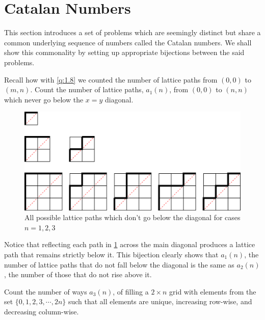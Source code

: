 \section{Catalan Numbers}
This section introduces a set of problems which are seemingly distinct but share a common underlying sequence of numbers called the Catalan numbers. We shall show this commonality by setting up appropriate bijections between the said problems. 
\begin{question}
Recall how with \cref{q:1.8} we counted the number of lattice paths from $(0,0)$ to $(m,n)$. Count the number of lattice paths, $a_1(n)$, from $(0,0)$ to $(n,n)$ which never go below the $x=y$ diagonal.
\end{question}
\begin{figure}[H]
    \centering
\includegraphics[width=0.8\linewidth]{Images/Figure11.png}
    \caption{All possible lattice paths which don't go below the diagonal for cases $n=1,2,3$}
    \label{f:3.21}
\end{figure}    
\begin{remark}
Notice that reflecting each path in \cref{f:3.21} across the main diagonal produces a lattice path that remains strictly below it. This bijection clearly shows that $a_1(n)$, the number of lattice paths that do not fall below the diagonal is the same as $a_2(n)$, the number of those that do not rise above it.
\end{remark}
\begin{question}
Count the number of ways $a_3(n)$, of filling a $2\times n$ grid with elements from the set $\{0,1,2,3,\cdots,2n\}$ such that all elements are unique, increasing row-wise, and decreasing column-wise.
\end{question}
